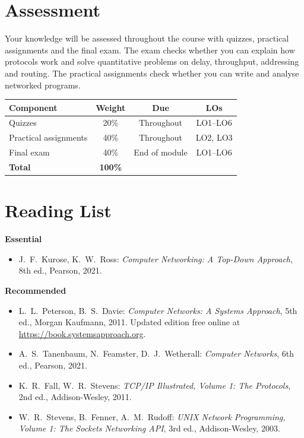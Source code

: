 \documentclass[11pt,a4paper]{article}
\begin{document}
\section{Assessment}
Your knowledge will be assessed throughout the course with quizzes, practical
assignments and the final exam. The exam checks whether you can explain how
protocols work and solve quantitative problems on delay, throughput, addressing and
routing. The practical assignments check whether you can write and analyse networked
programs.

\begin{tabularx}{\textwidth}{X c c c}
\toprule
\textbf{Component} & \textbf{Weight} & \textbf{Due} & \textbf{LOs} \\
\midrule
Quizzes & 20\% & Throughout & LO1--LO6 \\
Practical assignments & 40\% & Throughout & LO2, LO3 \\
Final exam & 40\% & End of module & LO1--LO6 \\
\midrule
\textbf{Total} & \textbf{100\%} & & \\
\bottomrule
\end{tabularx}

\section{Reading List}
\textbf{Essential}
\begin{itemize}
  \item J.\ F.\ Kurose, K.\ W.\ Ross: \textit{Computer Networking: A Top-Down Approach}, 8th ed., Pearson, 2021.
\end{itemize}
\textbf{Recommended}
\begin{itemize}
  \item L.\ L.\ Peterson, B.\ S.\ Davie: \textit{Computer Networks: A Systems Approach}, 5th ed., Morgan Kaufmann, 2011. Updated edition free online at \url{https://book.systemsapproach.org}.
  \item A.\ S.\ Tanenbaum, N.\ Feamster, D.\ J.\ Wetherall: \textit{Computer Networks}, 6th ed., Pearson, 2021.
  \item K.\ R.\ Fall, W.\ R.\ Stevens: \textit{TCP/IP Illustrated, Volume 1: The Protocols}, 2nd ed., Addison-Wesley, 2011.
  \item W.\ R.\ Stevens, B.\ Fenner, A.\ M.\ Rudoff: \textit{UNIX Network Programming, Volume 1: The Sockets Networking API}, 3rd ed., Addison-Wesley, 2003.
\end{itemize}
\end{document}
